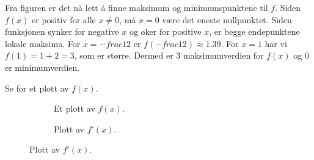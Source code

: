 \documentclass[11pt, norsk]{article}
\begin{document}
\begin{losn}
Fra figuren er det nå lett å finne maksimum og minimumspunktene til $f$. Siden $f(x)$ er positiv for alle $x \neq 0$, må $x=0$ være det eneste nullpunktet. Siden funksjonen synker for negative $x$ og øker for positive $x$, er begge endepunktene lokale maksima. For $x=-frac 12$ er $f(-frac 12) \approx 1.39$. For $x=1$ har vi $f(1) = 1+2=3$, som er større. Dermed er $3$ maksimumverdien for $f(x)$ og $0$ er minimumverdien.

Se  for et plott av $f(x)$.

\begin{figure}
\centering
\begin{subfigure}{.4 \textwidth}
\caption{Et plott av $f(x)$.}
\label{fig:plott}
\end{subfigure}
\begin{subfigure}{.4 \textwidth}

\caption{Plott av $f'(x)$.}
\end{subfigure}
\end{figure}
\end{losn}
\end{document}
